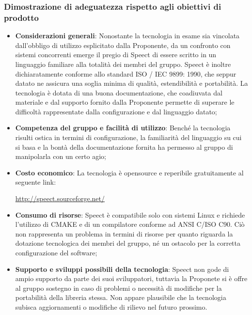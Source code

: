 \documentclass[./../Technology Baseline.tex]{subfiles}
\begin{document}
\subsubsection{Dimostrazione di adeguatezza rispetto agli obiettivi di prodotto}
\begin{itemize}
	\item \textbf{Considerazioni generali}: Nonostante la tecnologia in esame sia vincolata dall'obbligo di utilizzo esplicitato dalla Proponente, da un confronto con sistemi concorrenti emerge il pregio di Speect di essere scritto in un linguaggio familiare alla totalità dei membri del gruppo. Speect è inoltre dichiaratamente conforme allo standard ISO / IEC 9899: 1990, che seppur datato ne assicura una soglia minima di qualità, estendibilità e portabilità. La tecnologia è dotata di una buona documentazione, che coadiuvata dal materiale e dal supporto fornito dalla Proponente permette di superare le difficoltà rappresentate dalla configurazione e dal linguaggio datato;
	
	\item \textbf{Competenza del gruppo e facilità di utilizzo}: Benché la tecnologia risulti ostica in termini di configurazione, la familiarità del linguaggio su cui si basa e la bontà della documentazione fornita ha permesso al gruppo di manipolarla con un certo agio;
	
	\item \textbf{Costo economico}: La tecnologia è opensource e reperibile gratuitamente al seguente link:
	\begin{center}
		\url{http://speect.sourceforge.net/}
	\end{center}

	\item \textbf{Consumo di risorse}: Speect è compatibile solo con sistemi Linux e richiede l'utilizzo di CMAKE e di un compilatore conforme ad ANSI C/ISO C90. Ciò non rappresenta un problema in termini di risorse per quanto riguarda la dotazione tecnologica dei membri del gruppo, né un ostacolo per la corretta configurazione del software;
	
	\item \textbf{Supporto e sviluppi possibili della tecnologia}: Speect non gode di ampio supporto da parte dei suoi sviluppatori, tuttavia la Proponete si è offre al gruppo sostegno in caso di problemi o necessità di modifiche per la portabilità della libreria stessa. Non appare plausibile che la tecnologia subisca aggiornamenti o modifiche di rilievo nel futuro prossimo.
\end{itemize}
\end{document}
